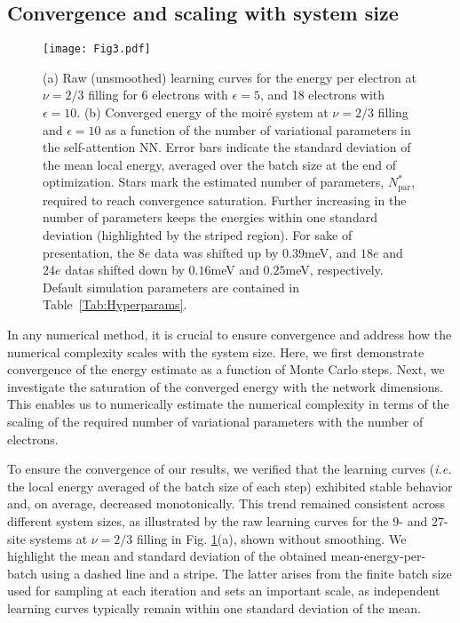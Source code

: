 \documentclass[
 reprint,
 amsmath,amssymb,
 aps, prx,
floatfix,longbibliography,
]{revtex4-2}
\begin{document}
\subsection{Convergence and scaling with system size}

\begin{figure}
    \centering
    \texttt{[image: Fig3.pdf]}
    \caption{(a) Raw (unsmoothed) learning curves for the energy per electron at $\nu=2/3$ filling for 6 electrons with $\epsilon = 5$, and 18 electrons with $\epsilon = 10$.
    (b)
    Converged energy of the moir\'e system at $\nu = 2/3$ filling and $\epsilon = 10$ as a function of the number of variational parameters in the self-attention NN. Error bars indicate the standard deviation of the mean local energy, averaged over the batch size at the end of optimization. Stars mark the estimated number of parameters, $N^{*}_\text{par}$, required to reach convergence saturation. Further increasing in the number of parameters keeps the energies within one standard deviation (highlighted by the striped region). For sake of presentation, the $8e$ data was shifted up by $0.39$meV, and $18e$ and $24e$ datas shifted down by $0.16$meV and $0.25$meV, respectively. Default simulation parameters are contained in Table~\ref{Tab:Hyperparams}. } 
    \label{fig:3}
\end{figure}



In any numerical method, it is crucial to ensure convergence and address how the numerical complexity scales with the system size. 
%
Here, we first demonstrate convergence of the energy estimate as a function of Monte Carlo steps. 
%
Next, we investigate the saturation of the converged energy with the network dimensions.
%
This enables us to numerically estimate the numerical complexity in terms of the scaling of the required number of variational parameters with the number of electrons. 



To ensure the convergence of our results, we verified that the learning curves ({\it i.e.} the local energy averaged of the batch size of each step) exhibited stable behavior and, on average, decreased monotonically. This trend remained consistent across different system sizes, as illustrated by the raw learning curves for the 9- and 27-site systems at $\nu=2/3$ filling in Fig. \ref{fig:3}(a), shown without smoothing. We highlight the mean and standard deviation of the obtained mean-energy-per-batch using a dashed line and a stripe. The latter arises from the finite batch size used for sampling at each iteration and sets an important scale, as independent learning curves typically remain within one standard deviation of the mean.
\end{document}
